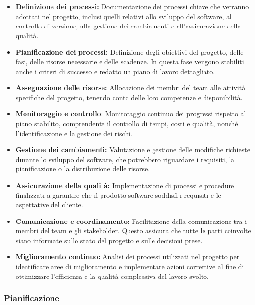 \begin{itemize}
    \item \textbf{Definizione dei processi:} Documentazione dei processi chiave che verranno adottati nel progetto, inclusi quelli relativi allo sviluppo del software, al controllo di versione, alla gestione dei cambiamenti e all'assicurazione della qualità.
    
    \item \textbf{Pianificazione dei processi:} Definizione degli obiettivi del progetto, delle fasi, delle risorse necessarie e delle scadenze. In questa fase vengono stabiliti anche i criteri di successo e redatto un piano di lavoro dettagliato.
    
    \item \textbf{Assegnazione delle risorse:} Allocazione dei membri del team alle attività specifiche del progetto, tenendo conto delle loro competenze e disponibilità.
    
    \item \textbf{Monitoraggio e controllo:} Monitoraggio continuo dei progressi rispetto al piano stabilito, comprendente il controllo di tempi, costi e qualità, nonché l'identificazione e la gestione dei rischi.
    
    \item \textbf{Gestione dei cambiamenti:} Valutazione e gestione delle modifiche richieste durante lo sviluppo del software, che potrebbero riguardare i requisiti, la pianificazione o la distribuzione delle risorse.
    
    \item \textbf{Assicurazione della qualità:} Implementazione di processi e procedure finalizzati a garantire che il prodotto software soddisfi i requisiti e le aspettative del cliente.
    
    \item \textbf{Comunicazione e coordinamento:} Facilitazione della comunicazione tra i membri del team e gli stakeholder. Questo assicura che tutte le parti coinvolte siano informate sullo stato del progetto e sulle decisioni prese.
    
    \item \textbf{Miglioramento continuo:} Analisi dei processi utilizzati nel progetto per identificare aree di miglioramento e implementare azioni correttive al fine di ottimizzare l’efficienza e la qualità complessiva del lavoro svolto.
\end{itemize}


\subsubsection{Pianificazione}
